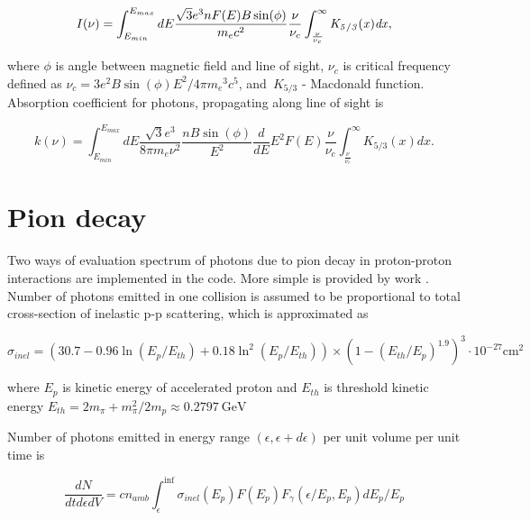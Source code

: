 \begin{equation} \label{emission}
	I(\nu)=\int_{E_{min}}^{E_{max}} dE \frac {\sqrt {3}{e}^{3}n F(E) B \sin ( \phi)}{{m_e}{c}^{2}}
	\frac{\nu}{\nu_c}\int_{\frac {\nu}{\nu_c}}^{\infty }\it K_{5/3}(x)dx,
\end{equation}

where $\phi$ is angle between magnetic field and line of sight, $\displaystyle\nu_{c}$ is critical frequency defined as $\displaystyle\nu_{c} = 3 e^{2} B \sin(\phi) E^{2}/4\pi {m_{e}}^{3} c^{5}$, and~$K_{5/3}$ - Macdonald function.
Absorption coefficient for photons, propagating along line of sight is

\begin{equation}\label{absorption}
	k(\nu)=\int_{E_{min}}^{E_{max}}dE\frac {\sqrt {3}{e}^{3}}{8\pi m_e \nu^2}\frac{n B\sin(\phi)}{E^2}
	\frac{d}{dE} E^2 F(E)\frac {\nu}{ \nu_c}\int_{\frac {\nu}{ \nu_c}}^{\infty }K_{5/3}(x) dx.
\end{equation}

\section{Pion decay}

Two ways of evaluation spectrum of photons due to pion decay in proton-proton interactions are implemented in the code. More simple is provided by work \cite{Kelner}. Number of photons emitted in one collision is assumed to be proportional to total cross-section of inelastic p-p scattering, which is approximated as \cite{Kafexhiu}

\begin{equation}\label{sigmainel}
	\sigma_{inel} = \left(30.7 - 0.96\ln\left(E_p/E_{th}\right) + 0.18\ln^2\left(E_p/E_{th}\right) \right)\times\left(1 - \left(E_{th}/E_p\right)^{1.9}\right)^3\cdot10^{-27} \text{cm}^{2}
\end{equation}

where $E_p$ is kinetic energy of accelerated proton and $E_{th}$ is threshold kinetic energy $E_{th} = 2m_{\pi}+m^2_{\pi}/2m_p \approx 0.2797~\text{GeV}$

Number of photons emitted in energy range $\left(\epsilon, \epsilon+d\epsilon\right)$ per unit volume per unit time is

\begin{equation}
	\frac{dN}{dt d\epsilon dV} = c n_{amb} \int_{\epsilon}^{\inf}\sigma_{inel}(E_p)F(E_p)F_{\gamma}(\epsilon/E_p, E_p) dE_p/E_p
\end{equation} 

